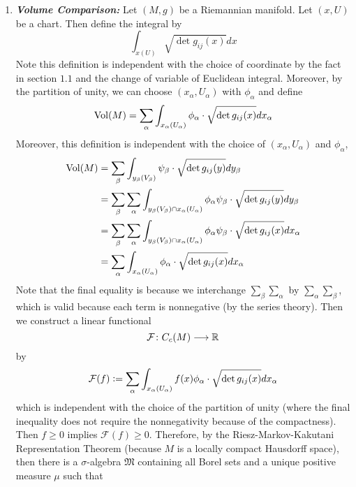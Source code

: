 \begin{enumerate}[label=\arabic{*}]
	\item \emph{\textbf{Volume Comparison:}} Let $(M,g)$ be a Riemannian manifold. Let $(x,U)$ be a chart. Then define the integral by
	\begin{equation*}
		\int_{x(U)}\sqrt{\det g_{ij}(x)}dx
	\end{equation*}
	Note this definition is independent with the choice of coordinate by the fact in section $1.1$ and the change of variable of Euclidean integral. Moreover, by the partition of unity, we can choose $(x_\alpha,U_\alpha)$ with $\phi_\alpha$ and define
	\begin{equation*}
		\operatorname{Vol}(M) = \sum_\alpha \int_{x_\alpha(U_\alpha)} \phi_\alpha\cdot\sqrt{\det g_{ij}(x)}dx_\alpha
	\end{equation*}
	Moreover, this definition is independent with the choice of $(x_\alpha,U_\alpha)$ and $\phi_\alpha$,
	\begin{equation*}
		\begin{aligned}
			\operatorname{Vol}(M) &= \sum_\beta \int_{y_\beta(V_\beta)} \psi_\beta\cdot\sqrt{\det g_{ij}(y)}dy_\beta \\
			&= \sum_\beta\sum_\alpha \int_{y_\beta(V_\beta) \cap x_\alpha(U_\alpha)} \phi_\alpha\psi_\beta\cdot\sqrt{\det g_{ij}(y)}dy_\beta \\
			&= \sum_\beta\sum_\alpha \int_{y_\beta(V_\beta) \cap x_\alpha(U_\alpha)} \phi_\alpha\psi_\beta\cdot\sqrt{\det g_{ij}(x)}dx_\alpha \\
			&=  \sum_\alpha \int_{x_\alpha(U_\alpha)} \phi_\alpha\cdot\sqrt{\det g_{ij}(x)}dx_\alpha
		\end{aligned}
	\end{equation*}
	Note that the final equality is because we interchange $\sum_\beta\sum_\alpha$ by $\sum_\alpha\sum_\beta$, which is valid because each term is nonnegative (by the series theory). Then we construct a linear functional
	\begin{equation*}
		\mathcal{F} \colon C_c(M) \longrightarrow \mathbb{R}
	\end{equation*}
	by
	\begin{equation*}
		\mathcal{F}(f) \vcentcolon= \sum_\alpha  \int_{x_\alpha(U_\alpha)} f(x)\phi_\alpha\cdot\sqrt{\det g_{ij}(x)}dx_\alpha
	\end{equation*}
	which is independent with the choice of the partition of unity (where the final inequality does not require the nonnegativity because of the compactness). Then $f \geq 0$ implies $\mathcal{F}(f) \geq 0$. Therefore, by the Riesz-Markov-Kakutani Representation Theorem (because $M$ is a locally compact Hausdorff space), then there is a $\sigma$-algebra $\mathfrak{M}$ containing all Borel sets and a unique positive measure $\mu$ such that

\end{enumerate}
